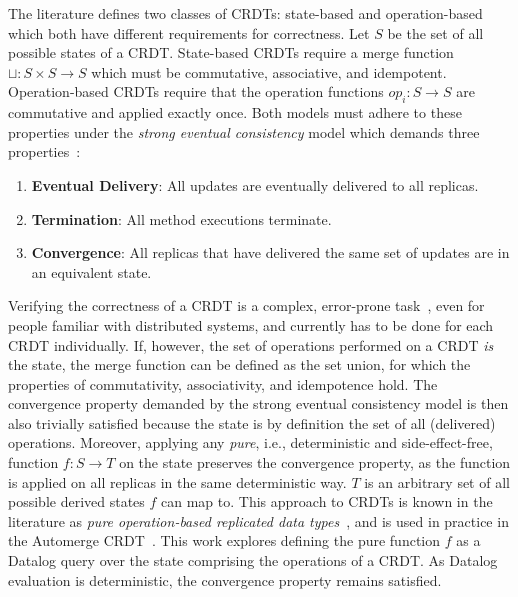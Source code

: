 The literature defines two classes of \acp{CRDT}: state-based and operation-based
which both have different requirements for correctness.
Let \( S \) be the set of all possible states of a \ac{CRDT}.
State-based \acp{CRDT} require a merge function \( \sqcup: S \times S \to S \)
which must be commutative, associative, and idempotent.
Operation-based \acp{CRDT} require that the operation functions \( op_i: S \to S \)
are commutative and applied exactly once.
Both models must adhere to these properties under the \emph{strong eventual consistency}
model which demands three properties~\cite{shapiro2011comprehensive}:

\begin{enumerate}
	\item \textbf{Eventual Delivery}: All updates are eventually delivered to
	      all replicas.
	\item \textbf{Termination}: All method executions terminate.
	\item \textbf{Convergence}: All replicas that have delivered the same set of
	      updates are in an equivalent state.
\end{enumerate}

Verifying the correctness of a \ac{CRDT} is a complex,
error-prone task~\cite{gomes2017verifying, kleppmann2022assessing},
even for people familiar with distributed systems,
and currently has to be done for each \ac{CRDT} individually.
If, however, the set of operations performed on a \ac{CRDT} \emph{is} the state,
the merge function can be defined as the set union,
for which the properties of commutativity, associativity, and idempotence hold.
The convergence property demanded by the strong eventual consistency
model is then also trivially satisfied because the state is by definition
the set of all (delivered) operations.
Moreover, applying any \emph{pure}, i.e., deterministic and side-effect-free,
function \( f: S \to T \) on the state preserves the convergence property,
as the function is applied on all replicas in the same deterministic way.
\( T \) is an arbitrary set of all possible derived states \( f \) can map to.
This approach to \acp{CRDT} is known in the literature as
\emph{pure operation-based replicated data types}~\cite{baquero2017pure, stewen2024undo},
and is used in practice in the Automerge \ac{CRDT}~\cite{automerge}.
This work explores defining the pure function \( f \) as a Datalog query
over the state comprising the operations of a \ac{CRDT}.
As Datalog evaluation is deterministic, the convergence property remains satisfied.

